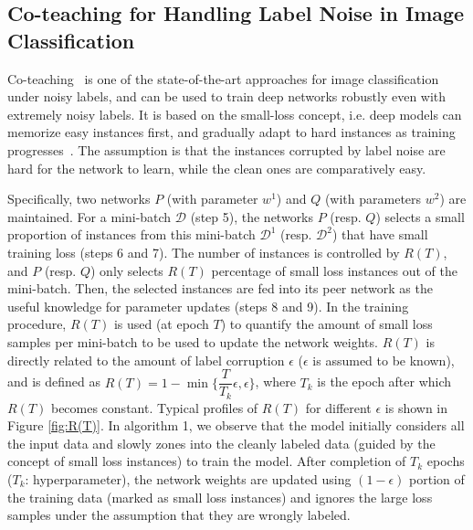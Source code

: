 \subsection{Co-teaching for Handling Label Noise in Image Classification}
Co-teaching~\cite{coteaching} is one of the state-of-the-art approaches for image classification under noisy labels, and can be used to train deep networks robustly even with extremely noisy labels.
It is based on the small-loss concept, i.e. deep models can memorize easy instances first, and gradually adapt to hard instances as training progresses~\cite{memorization}. 
The assumption is that the instances corrupted by label noise are hard for the network to learn, while the clean ones are comparatively easy. 

Specifically, two networks $P$ (with parameter $w^1$) and $Q$ (with parameters $w^2$) are maintained. 
For a mini-batch $\mathcal{D}$ (step 5), the networks $P$ (resp. $Q$) selects a small proportion of instances from this mini-batch $\mathcal{D}^1$ (resp. $\mathcal{D}^2$) that have small training loss (steps 6 and 7). 
The number of instances is controlled by $R(T)$, and $P$ (resp. $Q$) only selects $R(T)$ percentage of small loss instances out of the mini-batch. Then, the selected instances are fed into its peer network as the useful knowledge for parameter updates (steps 8 and 9).
In the training procedure, $R(T)$ is used (at epoch $T$) to quantify the amount of small loss
samples per mini-batch to be used to update the network weights. $R(T)$ is directly related
to the amount of label corruption $\epsilon$ ($\epsilon$ is assumed to be known), and is defined as $R(T)= 1- \min\bigg\{\dfrac{T}{T_k}\epsilon, \epsilon\bigg\}$, where $T_k$ is the epoch after which $R(T)$ becomes constant. Typical profiles of $R(T)$ for different $\epsilon$ is shown in Figure \ref{fig:R(T)}. In algorithm 1, we observe that the model initially considers all the input data and slowly zones into the cleanly labeled data (guided by the concept of small loss instances) to train the model. After completion of $T_k$ epochs ($T_k$: hyperparameter), the network weights are updated using $(1 - \epsilon)$ portion of the training data (marked as small loss instances) and ignores the large loss samples under the assumption that they are wrongly labeled.
